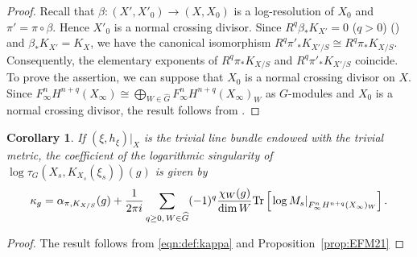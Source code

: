 \documentclass[amscd, leqno]{amsart}
\theoremstyle{plain}
\newtheorem{corollary}[theorem]{Corollary}
\theoremstyle{definition}
\theoremstyle{remark}
\newenvironment{pf}{\begin{proof}}{\end{proof}}
\begin{document}
\begin{pf}
Recall that $\beta \colon (X', X'_{0}) \to (X, X_{0})$ is a log-resolution of $X_{0}$ and $\pi' = \pi \circ \beta$.
Hence $X'_{0}$ is a normal crossing divisor. 
Since $R^{q}\beta_{*}K_{X'}=0$ ($q>0$) (\cite[Th.\,6.5 (i)]{Takegoshi95}) and $\beta_{*}K_{X'} = K_{X}$, 
we have the canonical isomorphism $R^{q}\pi'_{*}K_{X'/S} \cong R^{q}\pi_{*}K_{X/S}$.
Consequently, the elementary exponents of $R^{q}\pi_{*}K_{X/S}$ and $R^{q}\pi'_{*}K_{X'/S}$ coincide.
To prove the assertion, we can suppose that $X_{0}$ is a normal crossing divisor on $X$.
Since $F^{n}_{\infty}H^{n+q}(X_{\infty}) \cong \bigoplus_{W\in\widehat{G}} F^{n}_{\infty}H^{n+q}(X_{\infty})_{W}$ as $G$-modules
and $X_{0}$ is a normal crossing divisor, the result follows from \cite[Prop.\,2.10]{EFM21}.
\end{pf}


\begin{corollary}
\label{cor:sing:tors:triv}
If $(\xi, h_{\xi})|_{X}$ is the trivial line bundle endowed with the trivial metric, the coefficient of the logarithmic singularity of
$\log \tau_{G}(X_{s}, K_{X_{s}}(\xi_{s}))(g)$ is given by
$$
\kappa_{g} = 
\alpha_{\pi, K_{X/S}}(g)
+
\frac{1}{2\pi i} \sum_{q\geq 0,\,W \in \widehat{G}} (-1)^{q} \frac{\chi_{W}(g)}{\dim W}
{\rm Tr} \left[ \left. \log M_{s} \right|_{F^{n}_{\infty}H^{n+q}(X_{\infty})_{W}} \right].
$$
\end{corollary}

\begin{pf}
The result follows from \eqref{eqn:def:kappa} and Proposition~\ref{prop:EFM21}
\end{pf}


 

\end{document}
